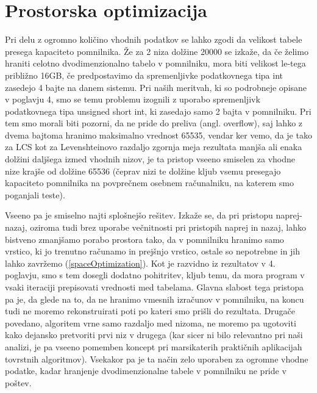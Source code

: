 \documentclass[a4paper,12pt,openright]{book}
\begin{document}
\section{Prostorska optimizacija}

Pri delu z ogromno količino vhodnih podatkov se lahko zgodi da velikost tabele presega kapaciteto pomnilnika. Že za 2 niza dolžine 20000 se izkaže, da če želimo hraniti celotno dvodimenzionalno tabelo v pomnilniku, mora biti velikost le-tega približno 16GB, če predpostavimo da spremenljivke podatkovnega tipa int zasedejo 4 bajte na danem sistemu. Pri naših meritvah, ki so podrobneje opisane v poglavju 4, smo se temu problemu izognili z uporabo spremenljivk podatkovnega tipa unsigned short int, ki zasedajo samo 2 bajta v pomnilniku. Pri tem smo morali biti pozorni, da ne pride do preliva (angl. overflow), saj lahko z dvema bajtoma hranimo maksimalno vrednost 65535, vendar ker vemo, da je tako za LCS kot za Levenshteinovo razdaljo zgornja meja rezultata manjša ali enaka dolžini daljšega izmed vhodnih nizov, je ta pristop vseeno smiselen za vhodne nize krajše od dolžine 65536 (čeprav nizi te dolžine kljub vsemu presegajo kapaciteto pomnilnika na povprečnem osebnem računalniku, na katerem smo poganjali teste). 

Vseeno pa je smiselno najti splošnejšo rešitev. Izkaže se, da pri pristopu naprej-nazaj, oziroma tudi brez uporabe večnitnosti pri pristopih naprej in nazaj, lahko bistveno zmanjšamo porabo prostora tako, da v pomnilniku hranimo samo vrstico, ki jo trenutno računamo in prejšnjo vrstico, ostale so nepotrebne in jih lahko zavržemo (\ref{spaceOptimization}). Kot je razvidno iz rezultatov v 4. poglavju, smo s tem dosegli dodatno pohitritev, kljub temu, da mora program v vsaki iteraciji prepisovati vrednosti med tabelama. Glavna slabost tega pristopa pa je, da glede na to, da ne hranimo vmesnih izračunov v pomnilniku, na koncu tudi ne moremo rekonstruirati poti po kateri smo prišli do rezultata. Drugače povedano, algoritem vrne samo razdaljo med nizoma, ne moremo pa ugotoviti kako dejansko pretvoriti prvi niz v drugega (kar sicer ni bilo relevantno pri naši analizi, je pa vseeno pomemben koncept pri marsikaterih praktičnih aplikacijah tovrstnih algoritmov). Vsekakor pa je ta način zelo uporaben za ogromne vhodne podatke, kadar hranjenje dvodimenzionalne tabele v pomnilniku ne pride v poštev. 
\end{document}
